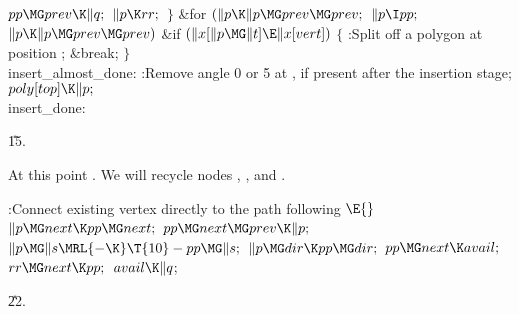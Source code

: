${}\\{pp}\MG\\{prev}\K\|q;{}$\6
${}\|p\K\\{rr};{}$\6
\4${}\}{}$\2\6
\&{for} ${}(\|p\K\|p\MG\\{prev}\MG\\{prev};{}$ ${}\|p\I\\{pp};{}$ ${}\|p\K\|p%
\MG\\{prev}\MG\\{prev}){}$\1\6
\&{if} ${}(\|x[\|p\MG\|t]\E\|x[\\{vert}]){}$\5
${}\{{}$\1\6
:Split off a polygon at position \X;\6
\&{break};\6
\4${}\}{}$\2\2\6
\4\\{insert\_almost\_done}:\5
:Remove angle 0 or 5 at , if present after the 
insertion stage\X;\6
${}\\{poly}[\\{top}]\K\|p;{}$\6
\4\\{insert\_done}:\par
\U15.\fi

At this point . We will recycle nodes , , and .

\Y\B\4:Connect existing vertex  directly to the path
following \X${}\E{}$\6
$\|p\MG\\{next}\K\\{pp}\MG\\{next};{}$\6
${}\\{pp}\MG\\{next}\MG\\{prev}\K\|p;{}$\6
${}\|p\MG\|s\MRL{-{\K}}\T{10}-\\{pp}\MG\|s;{}$\6
${}\|p\MG\\{dir}\K\\{pp}\MG\\{dir};{}$\6
${}\\{pp}\MG\\{next}\K\\{avail};{}$\6
${}\\{rr}\MG\\{next}\K\\{pp};{}$\6
${}\\{avail}\K\|q{}$;\par
\U22.\fi

